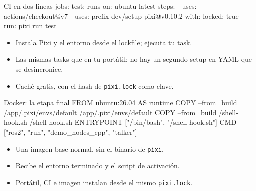 \documentclass[aspectratio=169]{beamer}
\begin{document}
\begin{frame}[fragile]{CI en dos líneas}
jobs:
  test:
    runs-on: ubuntu-latest
    steps:
      - uses: actions/checkout@v7
      - uses: prefix-dev/setup-pixi@v0.10.2
        with:
          locked: true
      - run: pixi run test
\begin{itemize}
    \item Instala Pixi y el entorno desde el lockfile; ejecuta tu task.
    \item Las mismas tasks que en tu portátil: no hay un segundo setup en YAML que se desincronice.
    \item Caché gratis, con el hash de \lstinline|pixi.lock| como clave.
\end{itemize}
\end{frame}


\begin{frame}[fragile]{Docker: la etapa final}
FROM ubuntu:26.04 AS runtime
COPY --from=build /app/.pixi/envs/default /app/.pixi/envs/default
COPY --from=build /shell-hook.sh /shell-hook.sh
ENTRYPOINT ["/bin/bash", "/shell-hook.sh"]
CMD ["ros2", "run", "demo_nodes_cpp", "talker"]
\vfill
\begin{itemize}
    \item Una imagen base normal, sin el binario de \texttt{pixi}.
    \item Recibe el entorno terminado y el script de activación.
    \item Portátil, CI e imagen instalan desde el mismo \lstinline|pixi.lock|.
\end{itemize}
\end{frame}
\end{document}

